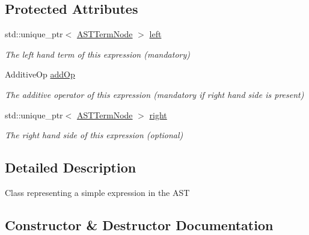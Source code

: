 \subsection*{Protected Attributes}
\begin{DoxyCompactItemize}
\item 
\mbox{\label{classparser_1_1ast_1_1ASTSimpleExprNode_a3b8bc0ddeea8a027690259b2403c9f57}} 
std\+::unique\+\_\+ptr$<$ \hyperlink{classparser_1_1ast_1_1ASTTermNode}{A\+S\+T\+Term\+Node} $>$ \hyperlink{classparser_1_1ast_1_1ASTSimpleExprNode_a3b8bc0ddeea8a027690259b2403c9f57}{left}
\begin{DoxyCompactList}\small\item\em The left hand term of this expression (mandatory) \end{DoxyCompactList}\item 
\mbox{\label{classparser_1_1ast_1_1ASTSimpleExprNode_a7b0f1134025df83440c78636f2c1dbd3}} 
Additive\+Op \hyperlink{classparser_1_1ast_1_1ASTSimpleExprNode_a7b0f1134025df83440c78636f2c1dbd3}{add\+Op}
\begin{DoxyCompactList}\small\item\em The additive operator of this expression (mandatory if right hand side is present) \end{DoxyCompactList}\item 
\mbox{\label{classparser_1_1ast_1_1ASTSimpleExprNode_a3ca192d1465a7dfa33e7a1ece3084b54}} 
std\+::unique\+\_\+ptr$<$ \hyperlink{classparser_1_1ast_1_1ASTTermNode}{A\+S\+T\+Term\+Node} $>$ \hyperlink{classparser_1_1ast_1_1ASTSimpleExprNode_a3ca192d1465a7dfa33e7a1ece3084b54}{right}
\begin{DoxyCompactList}\small\item\em The right hand side of this expression (optional) \end{DoxyCompactList}\end{DoxyCompactItemize}


\subsection{Detailed Description}
Class representing a simple expression in the A\+ST 

\subsection{Constructor \& Destructor Documentation}
\mbox{\label{classparser_1_1ast_1_1ASTSimpleExprNode_a882595847c545ef257df28c35ded464d}} 
